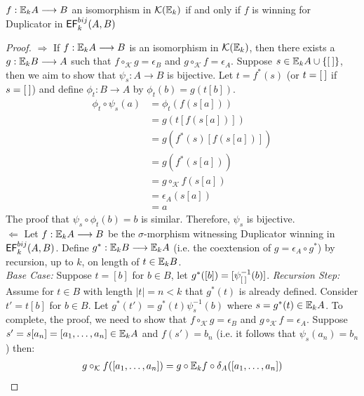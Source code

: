 \begin{prop}
$f:{\mathbb{E}_{k}A} \longrightarrow B$ an isomorphism in $\mathcal{K}({\mathbb{E}_{k}})$ if and only if $f$ is winning for Duplicator in ${\mathsf{EF}^{bij}_{k}(A,B)}$  
\begin{proof}
$\Rightarrow$ If $f:{\mathbb{E}_{k}A} \longrightarrow B$ is an isomorphism in $\mathcal{K}({\mathbb{E}_{k}})$, then there exists a $g:{\mathbb{E}_{k}B} \longrightarrow A$ such that $f \circ_{\mathcal{K}} g = \epsilon_{B}$ and $g \circ_{\mathcal{K}} f = \epsilon_{A}$. Suppose $s \in {\mathbb{E}_{k}A} \cup \{{[\:]}\}$, then we aim to show that $\psi_{s}:A \longrightarrow B$ is bijective. Let $t = f^{*}(s)$ (or $t = {[\:]}$ if $s = {[\:]}$) and define $\phi_{t}:B \longrightarrow A$ by $\phi_{t}(b) = g(t[b])$.   
\begin{align*}
\phi_{t} \circ \psi_{s}(a) &= \phi_{t}(f(s[a])) \\
&= g(t[f(s[a])]) \\
&= g(f^{*}(s)[f(s[a])]) \\
&= g(f^{*}(s[a])) \\
&= g \circ_{\mathcal{K}} f(s[a]) \\
&= \epsilon_{A}(s[a]) \\
&= a 
\end{align*}
The proof that $\psi_{s} \circ \phi_{t}(b) = b$ is similar. Therefore, $\psi_{s}$ is bijective. \\
$\Leftarrow$ Let $f:{\mathbb{E}_{k}A} \longrightarrow B$ be the $\sigma$-morphism witnessing Duplicator winning in ${\mathsf{EF}^{bij}_{k}(A,B)}$. Define $g^{*}:{\mathbb{E}_{k}B} \longrightarrow {\mathbb{E}_{k}A}$ (i.e. the coextension of $g = \epsilon_{A} \circ g^{*}$) by recursion, up to $k$, on length of $t \in {\mathbb{E}_{k}B}$. \\   
\textit{Base Case:} Suppose $t = [b]$ for $b \in B$, let $g^{*}([b]) = [\psi_{{[\:]}}^{-1}(b)]$.
\textit{Recursion Step:} Assume for $t \in B$ with length $|t| = n < k$ that $g^{*}(t)$ is already defined. Consider $t' = t[b]$ for $b \in B$. Let $g^{*}(t') = g^{*}(t)\psi_{s}^{-1}(b)$ where $s = g^{*}(t) \in {\mathbb{E}_{k}A}$. To complete, the proof, we need to show that $f \circ_{\mathcal{K}} g = \epsilon_{B}$ and $g \circ_{\mathcal{K}} f = \epsilon_{A}$. Suppose $s' = s[a_{n}] = [a_{1},\dots,a_{n}] \in {\mathbb{E}_{k}A}$ and $f(s') = b_{n}$ (i.e. it follows that $\psi_{s}(a_{n}) = b_{n}$) then: 
\begin{align*}
g \circ_{\mathcal{K}} f([a_{1},\dots,a_{n}]) &= g \circ \efcomonad{k}{f} \circ \delta_{A}([a_{1},\dots,a_{n}]) \\ 

\end{align*}
\end{proof}
\end{prop}
